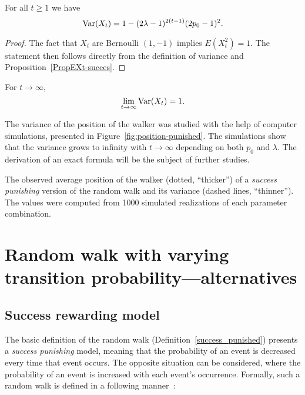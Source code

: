 \begin{proposition}
\label{propVarX}
For all $t\geq1$ we have
\begin{equation}
\mathop{\rm Var}(X_{t})=1-(2\lambda-1)^{2(t-1)}(2p_{0}-1)^2.
\end{equation}
\end{proposition}

\begin{proof}
The fact that $X_t$ are Bernoulli $(1,-1)$ implies $E(X_{t}^2)=1$.
The statement then follows directly from the definition of variance and Proposition~\ref{PropEXt-succes}.
\end{proof}


\begin{corollary}
For $t\rightarrow\infty,$
\begin{equation}
\lim_{t\to\infty}\mathop{\rm Var}(X_{t})=1.
\end{equation}
\end{corollary}

The variance of the position of the walker was studied with the help of computer simulations, presented in Figure~\ref{fig:position-punished}.
The simulations show that the variance grows to infinity with $t\rightarrow\infty$ depending on both $p_0$ and $\lambda$.
The derivation of an exact formula will be the subject of further studies.
\bigskip
\centerline{}
\caption{The observed average position of the walker (dotted, ``thicker'') of a \emph{success punishing} version of the random walk and its variance (dashed lines, ``thinner''). The values were computed from 1000 simulated realizations of each parameter combination.}\label{fig:position-punished}
\bigskip

\section{Random walk with varying transition probability---alternatives}\label{sec:Random-walk-aternatives}

\subsection{Success rewarding model}\label{subsec:success-rewarding-model}
The basic definition of the random walk (Defi\-nition~\ref{success_punished})
presents a \emph{success punishing} model, meaning that the probability
of an event is decreased every time that event occurs.
The opposite situation
can be considered, where the probability of an event is increased
with each event's occurrence.
Formally, such a random walk is defined
in a following manner~\cite{ja2019teze}:

